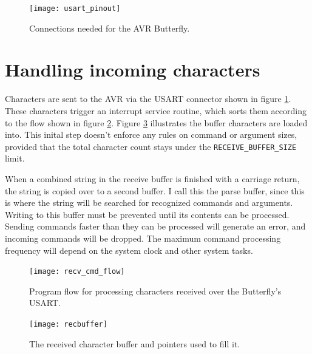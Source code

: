 \begin{figure}[ht]
    \begin{center}
        \texttt{[image: usart\_pinout]}
        \caption{Connections needed for the AVR Butterfly.\label{fig:connections}}
    \end{center}
\end{figure}

\clearpage
\section{Handling incoming characters}
Characters are sent to the AVR via the USART connector shown in figure \ref{fig:connections}.  These characters trigger an interrupt service routine, which sorts them according to the flow shown in figure \ref{fig:recflow}.  Figure \ref{fig:recbuffer} illustrates the buffer characters are loaded into.  This inital step doesn't enforce any rules on command or argument sizes, provided that the total character count stays under the \texttt{RECEIVE\_BUFFER\_SIZE} limit.

When a combined string in the receive buffer is finished with a carriage return, the string is copied over to a second buffer.  I call this the parse buffer, since this is where the string will be searched for recognized commands and arguments.  Writing to this buffer must be prevented until its contents can be processed.  Sending commands faster than they can be processed will generate an error, and incoming commands will be dropped.  The maximum command processing frequency will depend on the system clock and other system tasks.  

\begin{figure}[ht]
    \begin{center}
        \texttt{[image: recv\_cmd\_flow]}
        \caption{Program flow for processing characters received over the Butterfly's USART.\label{fig:recflow}}
    \end{center}
\end{figure}

\begin{figure}[ht]
    \begin{center}
        \texttt{[image: recbuffer]}
        \caption{The received character buffer and pointers used to fill it.\label{fig:recbuffer}}
    \end{center}
\end{figure}

